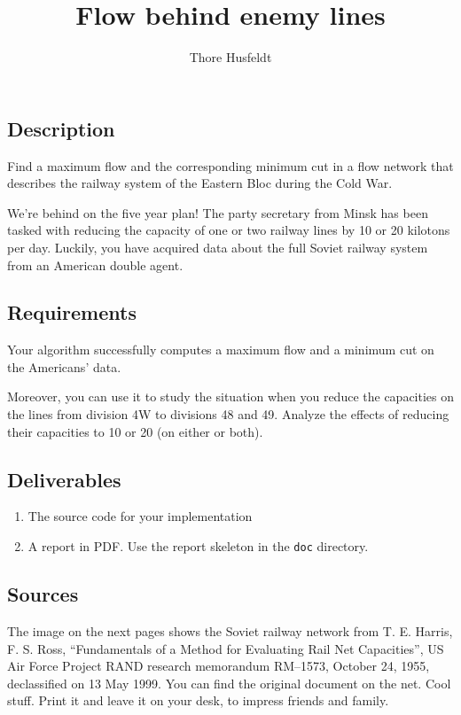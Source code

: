 \documentclass{tufte-handout}
\title{Flow behind enemy lines}
\author{Thore Husfeldt}
\begin{document}
\maketitle

\subsection{Description}
Find a maximum flow and the corresponding minimum cut in a flow network that describes the railway system of the Eastern Bloc during the Cold War.

We're behind on the five year plan!
The party secretary from Minsk has been tasked with reducing the capacity of one or two railway lines by 10 or 20 kilotons per day.
Luckily, you have acquired data about the full Soviet railway system from an American double agent.

\subsection{Requirements}

Your algorithm successfully computes a maximum flow and a minimum cut on the Americans' data.

Moreover, you can use it to study the situation when you reduce the capacities on the lines from division 4W to divisions 48 and 49.
Analyze the effects of reducing their capacities  to 10 or 20 (on either or both).

\subsection{Deliverables}

\begin{enumerate}
  \item The source code for your implementation
  \item A report in PDF.
  Use the report skeleton in the {\tt doc} directory.
  \end{enumerate}

\subsection{Sources}

The image on the next pages shows the Soviet railway network from T. E. Harris, F. S. Ross, ``Fundamentals of a Method for Evaluating Rail Net Capacities'', US Air Force Project RAND research memorandum RM–1573, October 24, 1955, declassified on 13 May 1999. You can find the original document on the net.
Cool stuff.
Print it and leave it on your desk, to impress friends and family.


\end{document}
